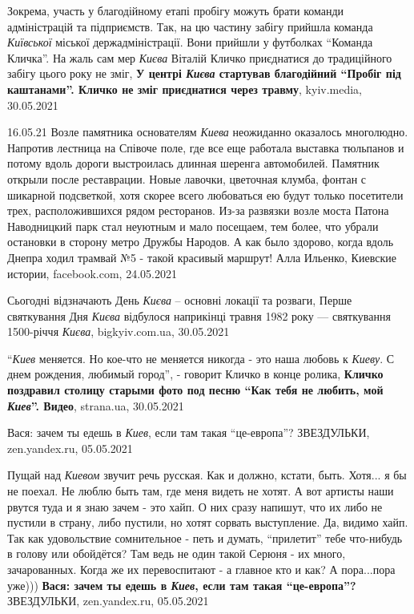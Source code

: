 Зокрема, участь у благодійному етапі пробігу можуть брати команди адміністрацій
та підприємств. Так, на цю частину забігу прийшла команда \emph{Київської}
міської держадміністрації. Вони прийшли у футболках \enquote{Команда Кличка}.
На жаль сам мер \emph{Києва} Віталій Кличко приєднатися до традиційного забігу
цього року не зміг, \textbf{У центрі \emph{Києва} стартував благодійний
\enquote{Пробіг під каштанами}. Кличко не зміг приєднатися через травму},
kyiv.media, 30.05.2021

16.05.21 Возле памятника основателям \emph{Киева} неожиданно оказалось
многолюдно.  Напротив лестница на  Співоче поле, где все еще работала выставка
тюльпанов и потому вдоль дороги выстроилась длинная шеренга
автомобилей. Памятник открыли после реставрации. Новые лавочки, цветочная
клумба, фонтан с шикарной подсветкой, хотя  скорее всего любоваться ею будут
только посетители трех, расположившихся рядом ресторанов. Из-за развязки возле
моста Патона Наводницкий парк стал неуютным и мало посещаем, тем более, что
убрали остановки в сторону метро Дружбы Народов. А как было здорово, когда
вдоль Днепра ходил трамвай №5 - такой красивый маршрут! Алла Ильенко, Киевские истории,
facebook.com, 24.05.2021

Сьогодні відзначають День \emph{Києва} – основні локації та розваги, Перше
святкування Дня \emph{Києва} відбулося наприкінці травня 1982 року —
святкування 1500-річчя \emph{Києва}, bigkyiv.com.ua, 30.05.2021

\enquote{\emph{Киев} меняется. Но кое-что не меняется никогда - это наша любовь к
\emph{Киеву}. С днем рождения, любимый город}, - говорит Кличко в конце ролика,
\textbf{Кличко поздравил столицу старыми фото под песню \enquote{Как тебя не
любить, мой \emph{Киев}}. Видео}, strana.ua, 30.05.2021

Вася: зачем ты едешь в \emph{Киев}, если там такая \enquote{це-европа}?
ЗВЕЗДУЛЬКИ, zen.yandex.ru, 05.05.2021

Пущай над \emph{Киевом} звучит речь русская. Как и должно, кстати, быть.
Хотя... я бы не поехал. Не люблю быть там, где меня видеть не хотят.  А вот
артисты наши рвутся туда и я знаю зачем - это хайп. О них сразу напишут, что их
либо не пустили в страну, либо пустили, но хотят сорвать выступление.  Да,
видимо хайп. Так как удовольствие сомнительное - петь и думать,
\enquote{прилетит} тебе что-нибудь в голову или обойдётся?  Там ведь не один
такой Серюня - их много, зачарованных.  Когда же их перевоспитают - а главное
кто и как? А пора...пора уже))) \textbf{Вася: зачем ты едешь в \emph{Киев},
если там такая \enquote{це-европа}?} ЗВЕЗДУЛЬКИ, zen.yandex.ru, 05.05.2021

